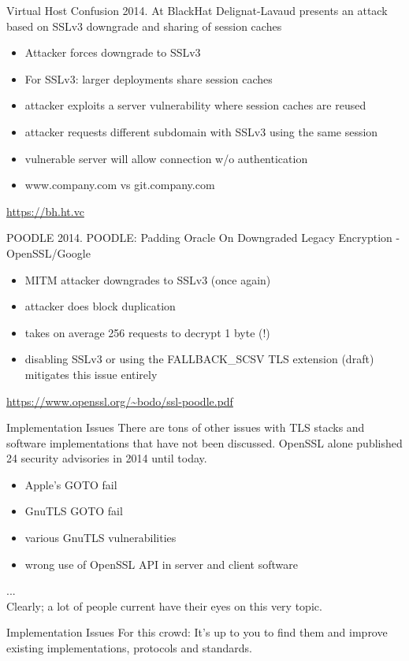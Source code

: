 \begin{frame}{Virtual Host Confusion}
  2014. At BlackHat Delignat-Lavaud presents an attack based on SSLv3 downgrade and sharing of session caches
  \begin{itemize}
    \item Attacker forces downgrade to SSLv3
    \item For SSLv3: larger deployments share session caches
    \item attacker exploits a server vulnerability where session caches are reused
    \item attacker requests different subdomain with SSLv3 using the same session
    \item vulnerable server will allow connection w/o authentication
    \item www.company.com vs git.company.com
  \end{itemize}
  \tiny
  \url{https://bh.ht.vc}
\end{frame}

\begin{frame}{POODLE}
  2014. POODLE: Padding Oracle On Downgraded Legacy Encryption - OpenSSL/Google
  \begin{itemize}
    \item MITM attacker downgrades to SSLv3 (once again)
    \item attacker does block duplication
    \item takes on average 256 requests to decrypt 1 byte (!)
    \item disabling SSLv3 or using the FALLBACK\_SCSV TLS extension (draft) mitigates this issue entirely
  \end{itemize}
  \tiny
  \url{https://www.openssl.org/~bodo/ssl-poodle.pdf}
\end{frame}

\begin{frame}{Implementation Issues}
  There are tons of other issues with TLS stacks and software implementations that have not been discussed.
  \newline
  \newline
  OpenSSL alone published 24 security advisories in 2014 until today.

  \begin{itemize}
    \item Apple's GOTO fail
    \item GnuTLS GOTO fail
    \item various GnuTLS vulnerabilities
    \item wrong use of OpenSSL API in server and client software
  \end{itemize}
  ...\\
  Clearly; a lot of people current have their eyes on this very topic.
\end{frame}

\begin{frame}{Implementation Issues}
  For this crowd: It's up to you to find them and improve existing implementations, protocols and standards.
\end{frame}
